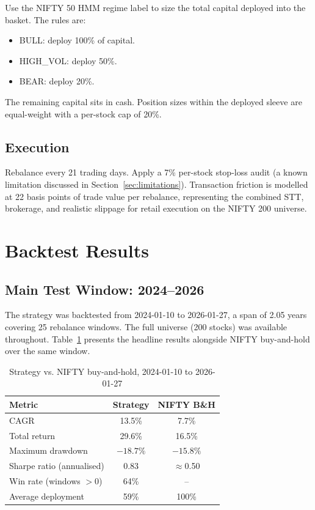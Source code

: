 \documentclass[conference]{IEEEtran}
\begin{document}
Use the NIFTY 50 HMM regime label to size the total capital deployed into the basket. The rules are:

\begin{itemize}
    \item BULL: deploy 100\% of capital.
    \item HIGH\_VOL: deploy 50\%.
    \item BEAR: deploy 20\%.
\end{itemize}

The remaining capital sits in cash. Position sizes within the deployed sleeve are equal-weight with a per-stock cap of 20\%.

\subsection{Execution}

Rebalance every 21 trading days. Apply a 7\% per-stock stop-loss audit (a known limitation discussed in Section~\ref{sec:limitations}). Transaction friction is modelled at 22 basis points of trade value per rebalance, representing the combined STT, brokerage, and realistic slippage for retail execution on the NIFTY 200 universe.

\section{Backtest Results}

\subsection{Main Test Window: 2024--2026}

The strategy was backtested from 2024-01-10 to 2026-01-27, a span of 2.05 years covering 25 rebalance windows. The full universe (200 stocks) was available throughout. Table~\ref{tab:main-results} presents the headline results alongside NIFTY buy-and-hold over the same window.

\begin{table}[htbp]
\caption{Strategy vs. NIFTY buy-and-hold, 2024-01-10 to 2026-01-27}
\label{tab:main-results}
\centering
\begin{tabular}{lcc}
\toprule
\textbf{Metric} & \textbf{Strategy} & \textbf{NIFTY B\&H} \\
\midrule
CAGR & 13.5\% & 7.7\% \\
Total return & 29.6\% & 16.5\% \\
Maximum drawdown & $-18.7\%$ & $-15.8\%$ \\
Sharpe ratio (annualised) & 0.83 & $\approx$0.50 \\
Win rate (windows $>0$) & 64\% & -- \\
Average deployment & 59\% & 100\% \\
\bottomrule
\end{tabular}
\end{table}
\end{document}
